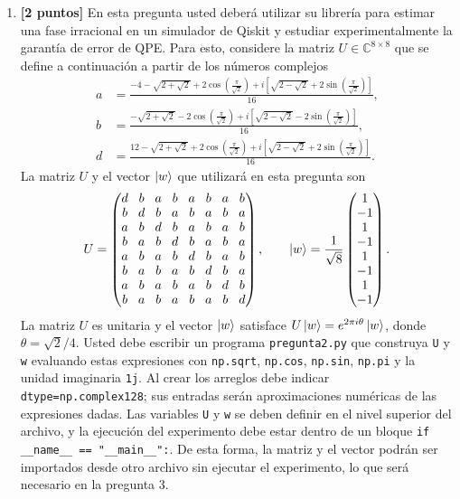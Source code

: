 \documentclass[10pt]{article}
\begin{document}
\begin{enumerate}
\item \textbf{[2 puntos]} En esta pregunta usted deberá utilizar su librería para estimar
  una fase irracional en un simulador de Qiskit y estudiar experimentalmente la garantía
  de error de QPE. Para esto, considere la matriz $U\in\mathbb C^{8\times8}$ que se
  define a continuación a partir de los números complejos
  \begin{align*}
    a&=\frac{-4-\sqrt{2+\sqrt2}+2\cos\!\left(\frac{\pi}{\sqrt2}\right)
      +i\left[\sqrt{2-\sqrt2}+2\sin\!\left(\frac{\pi}{\sqrt2}\right)\right]}{16},\\[3pt]
    b&=\frac{-\sqrt{2+\sqrt2}-2\cos\!\left(\frac{\pi}{\sqrt2}\right)
      +i\left[\sqrt{2-\sqrt2}-2\sin\!\left(\frac{\pi}{\sqrt2}\right)\right]}{16},\\[3pt]
    d&=\frac{12-\sqrt{2+\sqrt2}+2\cos\!\left(\frac{\pi}{\sqrt2}\right)
      +i\left[\sqrt{2-\sqrt2}+2\sin\!\left(\frac{\pi}{\sqrt2}\right)\right]}{16}.
  \end{align*}
  La matriz $U$ y el vector $\ket{w}$ que utilizará en esta pregunta son
  \[
  \begingroup
  \setlength{\arraycolsep}{4pt}
  \renewcommand{\arraystretch}{0.95}
  U=\begin{pmatrix}
    d&b&a&b&a&b&a&b\\
    b&d&b&a&b&a&b&a\\
    a&b&d&b&a&b&a&b\\
    b&a&b&d&b&a&b&a\\
    a&b&a&b&d&b&a&b\\
    b&a&b&a&b&d&b&a\\
    a&b&a&b&a&b&d&b\\
    b&a&b&a&b&a&b&d
  \end{pmatrix},
  \qquad
  \ket{w}=\frac1{\sqrt8}
  \begin{pmatrix}
    1\\-1\\1\\-1\\1\\-1\\1\\-1
  \end{pmatrix}.
  \endgroup
  \]
La matriz $U$ es unitaria y el vector $\ket{w}$ satisface
  $U\ket{w}=e^{2\pi i\theta}\ket{w}$, donde $\theta=\sqrt2/4$.
  Usted debe escribir un programa \texttt{pregunta2.py} que construya \texttt{U} y
  \texttt{w} evaluando estas expresiones con \texttt{np.sqrt}, \texttt{np.cos},
  \texttt{np.sin}, \texttt{np.pi} y la unidad imaginaria \texttt{1j}. Al crear los
  arreglos debe indicar \texttt{dtype=np.complex128}; sus entradas serán aproximaciones
  numéricas de las expresiones dadas. Las variables \texttt{U} y \texttt{w}
  se deben definir en el nivel superior del archivo, y la ejecución del experimento
  debe estar dentro de un bloque
  \mbox{\texttt{if \_\_name\_\_ == "\_\_main\_\_":}}. De esta forma, la matriz y el
  vector podrán ser importados desde otro archivo sin ejecutar el experimento, lo que
  será necesario en la pregunta 3.


\end{enumerate}
\end{document}
